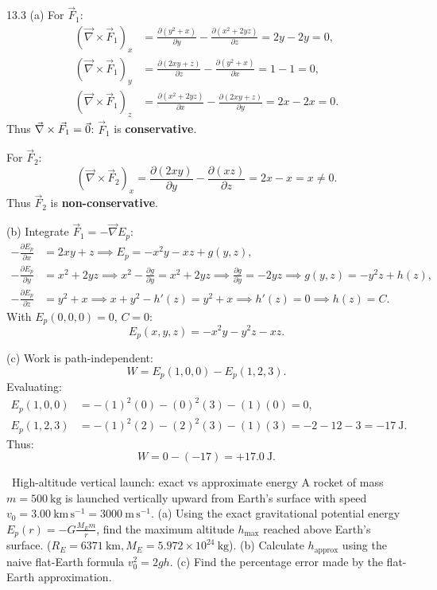 \begin{solution}{13.3}
(a) For $\vec{F}_1$:
\begin{align*}
(\vec{\nabla}\times\vec{F}_1)_x &= \frac{\partial(y^2+x)}{\partial y} - \frac{\partial(x^2+2yz)}{\partial z} = 2y - 2y = 0, \\
(\vec{\nabla}\times\vec{F}_1)_y &= \frac{\partial(2xy+z)}{\partial z} - \frac{\partial(y^2+x)}{\partial x} = 1 - 1 = 0, \\
(\vec{\nabla}\times\vec{F}_1)_z &= \frac{\partial(x^2+2yz)}{\partial x} - \frac{\partial(2xy+z)}{\partial y} = 2x - 2x = 0.
\end{align*}
Thus $\vec{\nabla}\times\vec{F}_1 = \vec{0}$: $\vec{F}_1$ is \textbf{conservative}.

For $\vec{F}_2$:
\[
(\vec{\nabla}\times\vec{F}_2)_x = \frac{\partial(2xy)}{\partial y} - \frac{\partial(xz)}{\partial z} = 2x - x = x \ne 0.
\]
Thus $\vec{F}_2$ is \textbf{non-conservative}.

(b) Integrate $\vec{F}_1 = -\vec{\nabla} E_p$:
\begin{align*}
-\frac{\partial E_p}{\partial x} &= 2xy + z \implies E_p = -x^2 y - xz + g(y, z), \\
-\frac{\partial E_p}{\partial y} &= x^2 + 2yz \implies x^2 - \frac{\partial g}{\partial y} = x^2 + 2yz \implies \frac{\partial g}{\partial y} = -2yz \implies g(y, z) = -y^2 z + h(z), \\
-\frac{\partial E_p}{\partial z} &= y^2 + x \implies x + y^2 - h'(z) = y^2 + x \implies h'(z) = 0 \implies h(z) = C.
\end{align*}
With $E_p(0,0,0) = 0$, $C = 0$:
\[
\boxed{E_p(x, y, z) = -x^2 y - y^2 z - xz.}
\]

(c) Work is path-independent:
\[
W = E_p(1, 0, 0) - E_p(1, 2, 3).
\]
Evaluating:
\begin{align*}
E_p(1, 0, 0) &= -(1)^2(0) - (0)^2(3) - (1)(0) = 0, \\
E_p(1, 2, 3) &= -(1)^2(2) - (2)^2(3) - (1)(3) = -2 - 12 - 3 = -17\ \mathrm{J}.
\end{align*}
Thus:
\[
W = 0 - (-17) = \mathbf{+17.0\ \mathrm{J}.}
\]
\end{solution}

\begin{exercise}{\core\ High-altitude vertical launch: exact vs approximate energy}
A rocket of mass $m=500\ \mathrm{kg}$ is launched vertically upward from Earth's surface with speed $v_0 = 3.00\ \mathrm{km\,s^{-1}} = 3000\ \mathrm{m\,s^{-1}}$.
(a) Using the exact gravitational potential energy $E_p(r) = -G\frac{M_E m}{r}$, find the maximum altitude $h_{\max}$ reached above Earth's surface. ($R_E = 6371\ \mathrm{km}, M_E = 5.972\times 10^{24}\ \mathrm{kg}$).
(b) Calculate $h_{\text{approx}}$ using the naive flat-Earth formula $v_0^2 = 2gh$.
(c) Find the percentage error made by the flat-Earth approximation.
\end{exercise}


